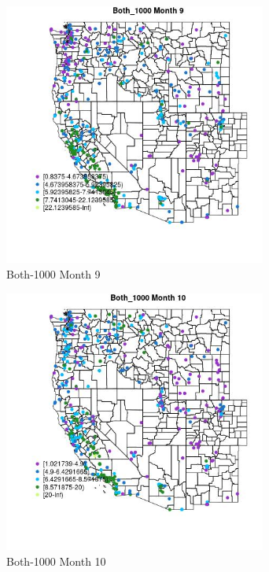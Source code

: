 \begin{figure} 
\centering  
\includegraphics[width=0.77\textwidth]{Code_Outputs/ML_input_report_ML_input_PM25_Step5_part_d_de_duplicated_aves_ML_input_MapObsMo9Both_1000.jpg} 
\caption{\label{fig:ML_input_report_ML_input_PM25_Step5_part_d_de_duplicated_aves_ML_inputMapObsMo9Both_1000}Both-1000 Month 9} 
\end{figure} 
 

\begin{figure} 
\centering  
\includegraphics[width=0.77\textwidth]{Code_Outputs/ML_input_report_ML_input_PM25_Step5_part_d_de_duplicated_aves_ML_input_MapObsMo10Both_1000.jpg} 
\caption{\label{fig:ML_input_report_ML_input_PM25_Step5_part_d_de_duplicated_aves_ML_inputMapObsMo10Both_1000}Both-1000 Month 10} 
\end{figure} 
 

